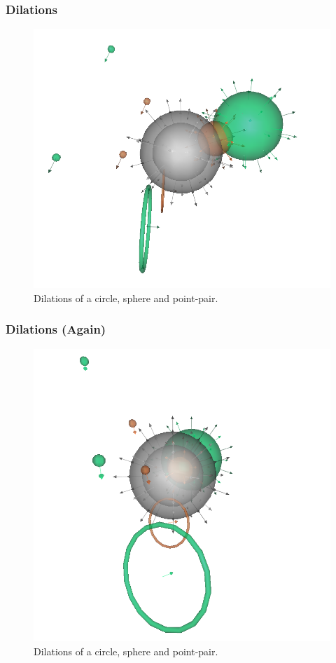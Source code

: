 \documentclass{beamer}
\begin{document}
\begin{frame}
\frametitle{Dilations}
\begin{figure}
\centering
\includegraphics[scale=0.4]{DilationsPerspectiveOne}
\caption{Dilations of a circle, sphere and point-pair.}
\end{figure}
\end{frame}

\begin{frame}
\frametitle{Dilations (Again)}
\begin{figure}
\centering
\includegraphics[scale=0.4]{DilationsPerspectiveTwo}
\caption{Dilations of a circle, sphere and point-pair.}
\end{figure}
\end{frame}
\end{document}
